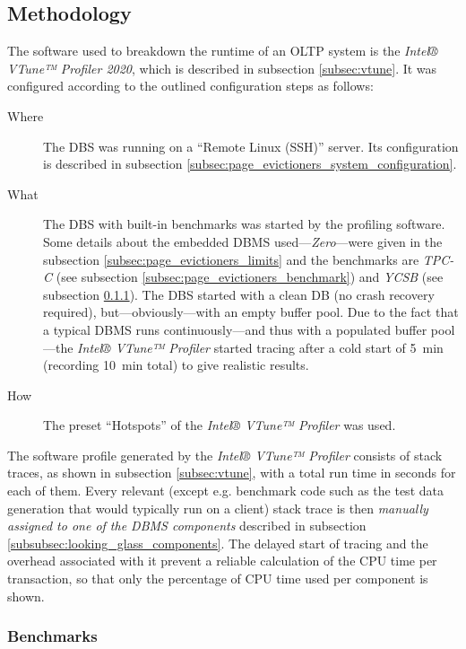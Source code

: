 \subsection{Methodology} \label{subsec:looking_glass_methodology}

    The software used to breakdown the runtime of an OLTP system is the \emph{Intel® VTune™ Profiler 2020}, which is described in subsection \ref{subsec:vtune}. It was configured according to the outlined configuration steps as follows:

\begin{description}
    \item[Where]    The DBS was running on a ``Remote Linux (SSH)'' server. Its configuration is described in subsection \ref{subsec:page_evictioners_system_configuration}.
    \item[What]     The DBS with built-in benchmarks was started by the profiling software. Some details about the embedded DBMS used---\textit{Zero}---were given in the subsection \ref{subsec:page_evictioners_limits} and the benchmarks are \textit{TPC-C} (see subsection \ref{subsec:page_evictioners_benchmark}) and \textit{YCSB} (see subsection \ref{subsubsec:looking_glass_benchmark}). The DBS started with a clean DB (no crash recovery required), but---obviously---with an empty buffer pool. Due to the fact that a typical DBMS runs continuously---and thus with a populated buffer pool---the \textit{Intel® VTune™ Profiler} started tracing after a cold start of \SI{5}{\minute} (recording \SI{10}{\minute} total) to give realistic results.
    \item[How]      The preset ``Hotspots'' of the \textit{Intel® VTune™ Profiler} was used.
\end{description}

    The software profile generated by the \textit{Intel® VTune™ Profiler} consists of stack traces, as shown in subsection \ref{subsec:vtune}, with a total run time in seconds for each of them. Every relevant (except e.g. benchmark code such as the test data generation that would typically run on a client) stack trace is then \emph{manually assigned to one of the DBMS components} described in subsection \ref{subsubsec:looking_glass_components}. The delayed start of tracing and the overhead associated with it prevent a reliable calculation of the CPU time per transaction, so that only the percentage of CPU time used per component is shown.

\subsubsection{Benchmarks} \label{subsubsec:looking_glass_benchmark}


